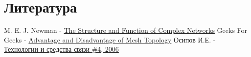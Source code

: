 \documentclass[a4paper]{article}
\begin{document}
\section{Литература}
\begin{thebibliography}{}
      M. E. J. Newman -  \href{https://github.com/julproh/Thesis}{The Structure and Function of Complex Networks}
      Geeks For Geeks -  \href{https://www.geeksforgeeks.org/advantage-and-disadvantage-of-mesh-topology/}{Advantage and Disadvantage of Mesh Topology}
      Осипов И.Е. -  \href{http://lib.tssonline.ru/articles2/fix-op/mesh_seti_techn_prilozh_oborud}{Технологии и средства связи \#4, 2006}
\end{thebibliography}
\end{document}
